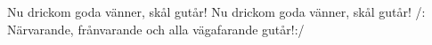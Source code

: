 

\beginverse*
Nu drickom goda vänner, skål gutår!
Nu drickom goda vänner, skål gutår!
/: Närvarande, frånvarande 
och alla vägafarande gutår!:/
\endverse

\vspace{5mm}
\endsong